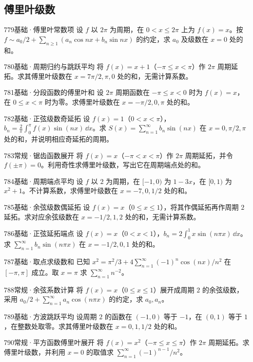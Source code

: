 \subsection{傅里叶级数}
\begin{exercise}{779}{基础·傅里叶常数项}
设 $f$ 以 $2\pi$ 为周期，在 $0<x\leq2\pi$ 上为 $f(x)=x$。按 $f\sim a_0/2+\sum_{n\geq1}(a_n\cos nx+b_n\sin nx)$ 的约定，求 $a_0$ 及级数在 $x=0$ 处的和。
\end{exercise}
\begin{exercise}{780}{基础·周期归约与跳跃平均}
将 $f(x)=x+1$（$-\pi\leq x<\pi$）作 $2\pi$ 周期延拓。求其傅里叶级数在 $x=7\pi/2,\pi,0$ 处的和，无需计算系数。
\end{exercise}
\begin{exercise}{781}{基础·分段函数的傅里叶和}
设 $2\pi$ 周期函数在 $-\pi\leq x<0$ 时为 $f(x)=x$，在 $0\leq x<\pi$ 时为零。求傅里叶级数在 $x=-\pi/2,0,\pi$ 处的和。
\end{exercise}
\begin{exercise}{782}{基础·正弦级数奇延拓}
设 $f(x)=1$（$0<x<\pi$），$b_n=\frac2\pi\int_0^\pi f(x)\sin(nx)\,\dd x$。求 $S(x)=\sum_{n=1}^{\infty}b_n\sin(nx)$ 在 $x=0,\pi/2,\pi$ 处的和，并说明相应奇延拓的周期。
\end{exercise}
\begin{exercise}{783}{常规·锯齿函数展开}
将 $f(x)=x$（$-\pi<x<\pi$）作 $2\pi$ 周期延拓，并令 $f(\pm\pi)=0$。利用奇性求傅里叶级数，写出它在周期端点处的和。
\end{exercise}
\begin{exercise}{784}{基础·周期端点平均}
设 $f$ 以 $2$ 为周期，在 $[-1,0)$ 为 $1-3x$，在 $[0,1)$ 为 $x^2+1$。不计算系数，求傅里叶级数在 $x=-7,0,1/2$ 处的和。
\end{exercise}
\begin{exercise}{785}{基础·余弦级数偶延拓}
设 $f(x)=x$（$0\leq x\leq1$），将其作偶延拓再作周期 $2$ 延拓。求对应余弦级数在 $x=-1/2,1,2$ 处的和，无需计算系数。
\end{exercise}
\begin{exercise}{786}{基础·正弦延拓端点}
设 $f(x)=x$（$0<x<1$），$b_n=2\int_0^1x\sin(n\pi x)\,\dd x$。求 $\sum_{n=1}^{\infty}b_n\sin(n\pi x)$ 在 $x=-1/2,0,1$ 处的和。
\end{exercise}
\begin{exercise}{787}{基础·取点求级数和}
已知 $x^2=\pi^2/3+4\sum_{n=1}^{\infty}(-1)^n\cos(nx)/n^2$ 在 $[-\pi,\pi]$ 成立。取 $x=\pi$ 求 $\sum_{n=1}^{\infty}n^{-2}$。
\end{exercise}
\begin{exercise}{788}{常规·余弦系数计算}
将 $f(x)=x$（$0\leq x\leq1$）展开成周期 $2$ 的余弦级数，采用 $a_0/2+\sum_{n=1}^{\infty}a_n\cos(n\pi x)$ 的约定，求 $a_0,a_n$。
\end{exercise}
\begin{exercise}{789}{基础·方波跳跃平均}
设周期 $2$ 的函数在 $(-1,0)$ 等于 $-1$，在 $(0,1)$ 等于 $1$，在整数处取零。求其傅里叶级数在 $x=0,1,1/2$ 处的和。
\end{exercise}
\begin{exercise}{790}{常规·平方函数傅里叶展开}
将 $f(x)=x^2$（$-\pi\leq x\leq\pi$）作 $2\pi$ 周期延拓。求傅里叶级数，并利用 $x=0$ 的取值求 $\sum_{n=1}^{\infty}(-1)^{n-1}/n^2$。
\end{exercise}
